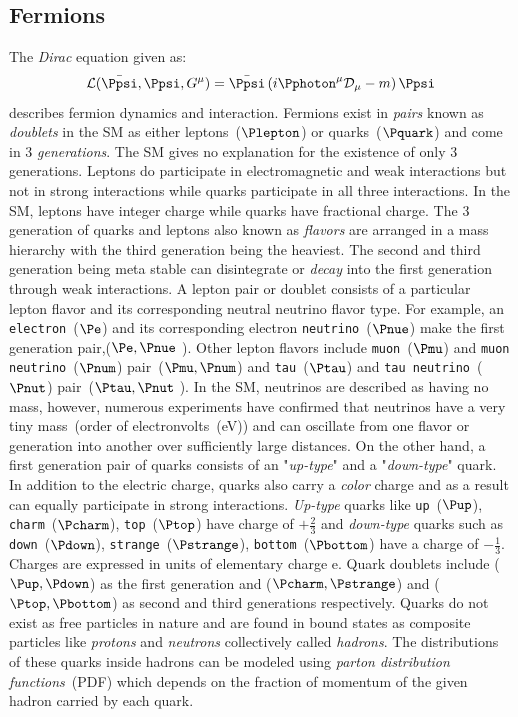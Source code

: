 \subsection*{Fermions}
The \textit{Dirac} equation given as:
\begin{equation}
\mathcal{L}(\bar{\Ppsi},\Ppsi, G^{\mu}) = \bar{\Ppsi}\left(i \Pphoton^{\mu}\mathcal{D}_{\mu} - m \right)\Ppsi 
\end{equation}
describes fermion dynamics and interaction.
Fermions exist in \textit{pairs} known as \textit{doublets} in the SM as either leptons~($\Plepton$) or quarks~($\Pquark $) and come in $3$ \textit{generations}. The SM gives no explanation for the existence of only 3 generations.
Leptons do participate in electromagnetic and weak interactions but not in strong interactions while quarks participate in all three interactions. In the SM, leptons have integer charge while quarks have fractional charge. The $3$ generation of quarks and leptons also known as \textit{flavors} are arranged in a mass hierarchy with the third generation being the heaviest. The second and third generation being meta stable can disintegrate or \textit{decay} into the first generation through weak interactions. 
A lepton pair or doublet consists of a particular lepton flavor and its corresponding neutral neutrino flavor type. For example, an \texttt{electron}~($\Pe$) and its corresponding electron \texttt{neutrino}~($\Pnue$) make the first generation pair,($\Pe,\Pnue$ ). Other lepton flavors include \texttt{muon}~($\Pmu$) and \texttt{muon neutrino}~($ \Pnum$) pair~($\Pmu,\Pnum $) and \texttt{tau}~($\Ptau$) and \texttt{tau neutrino}~($\Pnut$) pair~($\Ptau,\Pnut$ ). In the SM, neutrinos are described as having no mass, however, numerous experiments have confirmed that neutrinos have a very tiny mass~(order of electronvolts~(eV)) and can oscillate from one flavor or generation into another over sufficiently large distances.
\newline
On the other hand, a first generation pair of quarks consists of an "\textit{up-type}" and a "\textit{down-type}" quark. In addition to the electric charge, quarks also carry a \textit{color} charge and as a result can equally participate in strong interactions. \textit{Up-type} quarks like \texttt{up}~($\Pup$), \texttt{charm}~($\Pcharm$), \texttt{top}~($\Ptop$) have charge of $+\frac{2}{3}$ and \textit{down-type} quarks such as \texttt{down}~($\Pdown$), \texttt{strange}~($\Pstrange$), \texttt{bottom}~($\Pbottom$) have a charge of $-\frac{1}{3}$. Charges are expressed in units of elementary charge e. Quark doublets include ($\Pup, \Pdown$) as the first generation  and ($\Pcharm, \Pstrange$) and ($\Ptop, \Pbottom $) as second and third generations respectively. Quarks do not exist as free particles in nature and are found in bound states as composite particles like \textit{protons} and \textit{neutrons} collectively called \textit{hadrons}.  The distributions of these quarks inside hadrons can be modeled using  \textit{parton distribution functions}~(PDF) which depends on the fraction of momentum of the given hadron carried by each quark.

